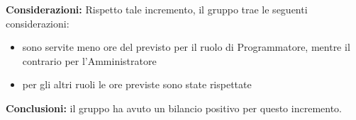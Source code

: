 {{\begin{longtable}{C{.4\freewidth} C{.2\freewidth} C{.2\freewidth}}
      \end{longtable} 
      
      \textbf{Considerazioni:} 
        Rispetto tale incremento, il gruppo trae le seguenti considerazioni:
        \begin{itemize}
            \item sono servite meno ore del previsto per il ruolo di Programmatore, mentre il contrario per l'Amministratore 
            \item per gli altri ruoli le ore previste sono state rispettate
        \end{itemize}

        \textbf{Conclusioni:} il gruppo ha avuto un bilancio positivo per questo incremento. 
    }
 }
